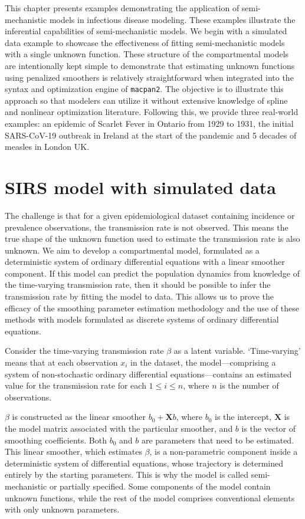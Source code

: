 \documentclass[
11pt, %
oneside, %
english, %
singlespacing, %
]{macthesis} %
\begin{document}
This chapter presents examples demonstrating the application of semi-mechanistic models in infectious disease modeling. These examples illustrate the inferential capabilities of semi-mechanistic models. We begin with a simulated data example to showcase the effectiveness of fitting semi-mechanistic models with a single unknown function. These structure of the compartmental models are intentionally kept simple to demonstrate that estimating unknown functions using penalized smoothers is relatively straightforward when integrated into the syntax and optimization engine of \texttt{macpan2}. The objective is to illustrate this approach so that modelers can utilize it without extensive knowledge of spline and nonlinear optimization literature. Following this, we provide three real-world examples: an epidemic of Scarlet Fever in Ontario from 1929 to 1931, the initial SARS-CoV-19 outbreak in Ireland at the start of the pandemic and 5 decades of measles in London UK.

\section{SIRS model with simulated data}\label{simulation}

The challenge is that for a given epidemiological dataset containing incidence or prevalence observations, the transmission rate is not observed. This means the true shape of the unknown function used to estimate the transmission rate is also unknown. We aim to develop a compartmental model, formulated as a deterministic system of ordinary differential equations with a linear smoother component. If this model can predict the population dynamics from knowledge of the time-varying transmission rate, then it should be possible to infer the transmission rate by fitting the model to data. This allows us to prove the efficacy of the smoothing parameter estimation methodology and the use of these methods with models formulated as discrete systems of ordinary differential equations.

Consider the time-varying transmission rate \(\beta\) as a latent variable. `Time-varying' means that at each observation \(x_i\) in the dataset, the model---comprising a system of non-stochastic ordinary differential equations---contains an estimated value for the transmission rate for each \(1 \leq i \leq n\), where \(n\) is the number of observations.

\(\beta\) is constructed as the linear smoother \(b_0 + \mathbf{X}b\), where \(b_0\) is the intercept, \(\mathbf{X}\) is the model matrix associated with the particular smoother, and \(b\) is the vector of smoothing coefficients. Both \(b_0\) and \(b\) are parameters that need to be estimated. This linear smoother, which estimates \(\beta\), is a non-parametric component inside a deterministic system of differential equations, whose trajectory is determined entirely by the starting parameters. This is why the model is called semi-mechanistic or partially specified. Some components of the model contain unknown functions, while the rest of the model comprises conventional elements with only unknown parameters.
\end{document}
